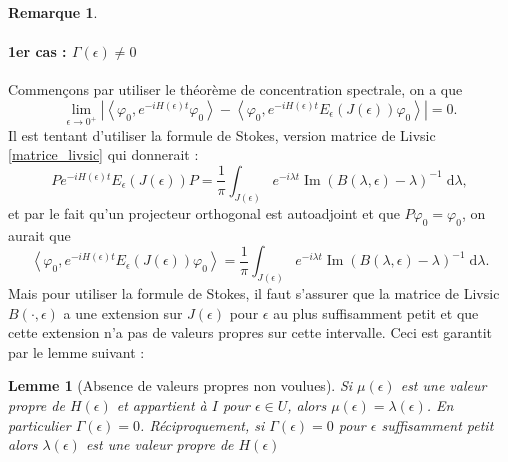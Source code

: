 \documentclass[12pt,openany,a4paper, titlepage]{article}
\newcommand{\f}[2]{\frac{#1}{#2}}
\newcommand{\lp}{\left(}
\newcommand{\rp}{\right)}
\newcommand{\la}{\left\langle}
\newcommand{\ra}{\right\rangle}
\newcommand{\dd}{\;\mathrm{d}}
\newcommand{\vp}{\varphi}
\newcommand{\im}{\operatorname{Im}}
\newtheorem{lem}{Lemme}
\theoremstyle{definition}
\theoremstyle{definition}
\theoremstyle{definition}
\theoremstyle{definition}
\theoremstyle{definition}
\newtheorem{rem}{Remarque}
\theoremstyle{definition}
\begin{document}
\begin{rem}
\paragraph{1er cas : $\Gamma(\epsilon) \neq 0$}
Commençons par utiliser le théorème de concentration spectrale, on a que 
\begin{equation}
    \lim\limits_{\epsilon \rightarrow 0^+} \left|\la \vp_0, e^{-iH(\epsilon)t} \vp_0 \ra - \la \vp_0, e^{-iH(\epsilon)t} E_\epsilon(J(\epsilon))\vp_0 \ra \right| = 0.
\end{equation}
Il est tentant d'utiliser la formule de Stokes, version matrice de Livsic \ref{matrice_livsic} qui donnerait :
\begin{equation}
    Pe^{-iH(\epsilon)t} E_\epsilon(J(\epsilon))P = \f{1}{\pi} \int_{J(\epsilon)} e^{-i\lambda t}\im \lp B(\lambda,\epsilon) - \lambda \rp^{-1} \dd \lambda,
\end{equation}
et par le fait qu'un projecteur orthogonal est autoadjoint et que $P\vp_0 = \vp_0$, on aurait que 
\begin{equation}
    \la \vp_0, e^{-iH(\epsilon)t} E_\epsilon(J(\epsilon))\vp_0 \ra = \f{1}{\pi} \int_{J(\epsilon)} e^{-i\lambda t}\im \lp B(\lambda,\epsilon) - \lambda \rp^{-1} \dd \lambda .
\end{equation}
Mais pour utiliser la formule de Stokes, il faut s'assurer que la matrice de Livsic $B(\cdot,\epsilon)$ a une extension sur $J(\epsilon)$ pour $\epsilon$ au plus suffisamment petit et que cette extension n'a pas de valeurs propres sur cette intervalle. Ceci est garantit par le lemme suivant :
\begin{lem}[Absence de valeurs propres non voulues]\label{absence_unwanted}
    Si $\mu(\epsilon)$ est une valeur propre de $H(\epsilon)$ et appartient à $I$ pour $\epsilon \in U$, alors $\mu(\epsilon) = \lambda(\epsilon)$. En particulier $\Gamma(\epsilon) = 0$. Réciproquement, si $\Gamma(\epsilon) = 0$ pour $\epsilon$ suffisamment petit alors $\lambda(\epsilon)$ est une valeur propre de $H(\epsilon)$
\end{lem}


\end{rem}
\end{document}
